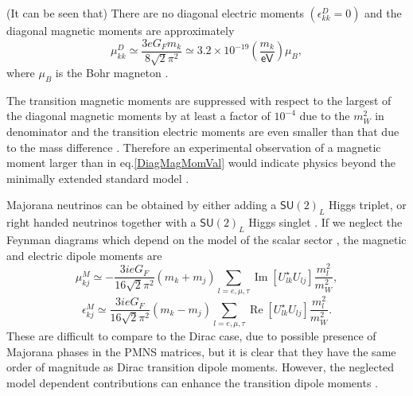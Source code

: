 (It can be seen that) There are no diagonal electric moments $\left(\epsilon_{kk}^D=0\right)$ and the diagonal magnetic moments are approximately
\begin{equation}\label{DiagMagMomVal}
\mu_{kk}^D\simeq\frac{3eG_Fm_k}{8\sqrt{2}\pi^2}\simeq 3.2\times 10^{-19}\left(\frac{m_k}{\textsf{eV}}\right)\mu_B,
\end{equation}
where $\mu_B$ is the Bohr magneton \cite{nuElmagInt2015.pdf}.

The transition magnetic moments are suppressed with respect to the largest of the diagonal magnetic moments by at least a factor of $10^{-4}$ due to the $m_W^2$ in denominator and the transition electric moments are even smaller than that due to the mass difference \cite{nuElmagInt2015.pdf}. Therefore an experimental observation of a magnetic moment larger than in eq.\ref{DiagMagMomVal} would indicate physics beyond the minimally extended standard model \cite{nuMMMajoranaBounds2006.pdf}.

Majorana neutrinos can be obtained by either adding a $\textsf{SU}\left(2\right)_L$ Higgs triplet, or right handed neutrinos together with a $\textsf{SU}\left(2\right)_L$ Higgs singlet . If we neglect the Feynman diagrams which depend on the model of the scalar sector , the magnetic and electric dipole moments are
\begin{equation}
\mu_{kj}^M\simeq -\frac{3ieG_F}{16\sqrt{2}\pi^2}\left(m_k+m_j\right)\sum_{l=e,\mu ,\tau}\operatorname{Im}\left[U^{\star}_{lk}U_{lj}\right]\frac{m_l^2}{m_W^2},
\end{equation}
\begin{equation}
\epsilon_{kj}^M\simeq \frac{3ieG_F}{16\sqrt{2}\pi^2}\left(m_k-m_j\right)\sum_{l=e,\mu ,\tau}\operatorname{Re}\left[U^{\star}_{lk}U_{lj}\right]\frac{m_l^2}{m_W^2}.
\end{equation}
These are difficult to compare to the Dirac case, due to possible presence of Majorana phases in the PMNS matrices, but it is clear that they have the same order of magnitude as Dirac transition dipole moments. However, the neglected model dependent contributions can enhance the transition dipole moments \cite{nuElmagInt2015.pdf}. 


